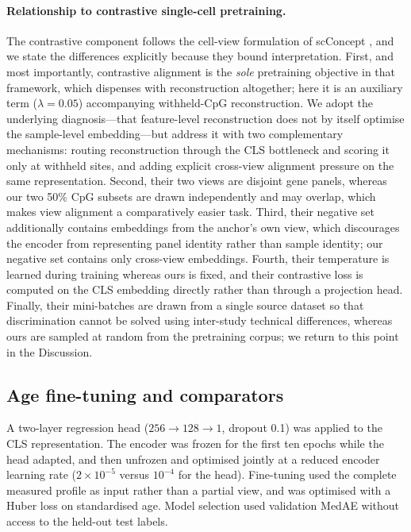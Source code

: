 \paragraph{Relationship to contrastive single-cell pretraining.}
The contrastive component follows the cell-view formulation of scConcept
\citep{Bahrami2025}, and we state the differences explicitly because they bound
interpretation. First, and most importantly, contrastive alignment is the \emph{sole}
pretraining objective in that framework, which dispenses with reconstruction altogether;
here it is an auxiliary term ($\lambda=0.05$) accompanying withheld-CpG reconstruction. We
adopt the underlying diagnosis---that feature-level reconstruction does not by itself
optimise the sample-level embedding---but address it with two complementary mechanisms:
routing reconstruction through the CLS bottleneck and scoring it only at withheld sites, and
adding explicit cross-view alignment pressure on the same representation. Second, their two
views are disjoint gene panels, whereas our two 50\% CpG subsets are drawn independently and
may overlap, which makes view alignment a comparatively easier task. Third, their negative
set additionally contains embeddings from the anchor's own view, which discourages the
encoder from representing panel identity rather than sample identity; our negative set
contains only cross-view embeddings. Fourth, their temperature is learned during training
whereas ours is fixed, and their contrastive loss is computed on the CLS embedding directly
rather than through a projection head. Finally, their mini-batches are drawn from a single
source dataset so that discrimination cannot be solved using inter-study technical
differences, whereas ours are sampled at random from the pretraining corpus; we return to
this point in the Discussion.

\subsection{Age fine-tuning and comparators}

A two-layer regression head ($256\rightarrow128\rightarrow1$, dropout 0.1) was applied to the
CLS representation. The encoder was frozen for the first ten epochs while the head adapted,
and then unfrozen and optimised jointly at a reduced encoder learning rate
($2\times10^{-5}$ versus $10^{-4}$ for the head). Fine-tuning used the complete measured
profile as input rather than a partial view, and was optimised with a Huber loss on
standardised age. Model selection used validation MedAE without access to the held-out test
labels.

